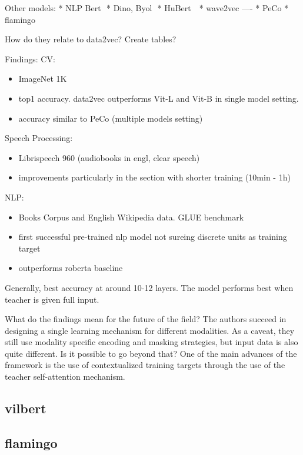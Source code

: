 \documentclass[
]{krantz}
\providecommand{\tightlist}{%
  \setlength{\itemsep}{0pt}\setlength{\parskip}{0pt}}
\begin{document}
Other models:
* NLP Bert 
* Dino, Byol 
* HuBert  
* wave2vec
----
* PeCo
* flamingo

How do they relate to data2vec? Create tables?

Findings:
CV:

\begin{itemize}
\tightlist
\item
  ImageNet 1K
\item
  top1 accuracy. data2vec outperforms Vit-L and Vit-B in single model setting.
\item
  accuracy similar to PeCo (multiple models setting)
\end{itemize}

Speech Processing:

\begin{itemize}
\tightlist
\item
  Librispeech 960 (audiobooks in engl, clear speech)
\item
  improvements particularly in the section with shorter training (10min - 1h)
\end{itemize}

NLP:

\begin{itemize}
\tightlist
\item
  Books Corpus and English Wikipedia data. GLUE benchmark
\item
  first successful pre-trained nlp model not sureing discrete units as training target
\item
  outperforms roberta baseline
\end{itemize}

Generally, best accuracy at around 10-12 layers.
The model performs best when teacher is given full input.

What do the findings mean for the future of the field?
The authors succeed in designing a single learning mechanism for different modalities. As a caveat, they still use modality specific encoding and masking strategies, but input data is also quite different. Is it possible to go beyond that? One of the main advances of the framework is the use of contextualized training targets through the use of the teacher self-attention mechanism.

\hypertarget{vilbert}{%
\subsection{vilbert}\label{vilbert}}

\hypertarget{flamingo-alayrac2022flamingo}{%
\subsection{\texorpdfstring{flamingo \citet{alayrac2022flamingo}}{flamingo @alayrac2022flamingo}}\label{flamingo-alayrac2022flamingo}}
\end{document}
